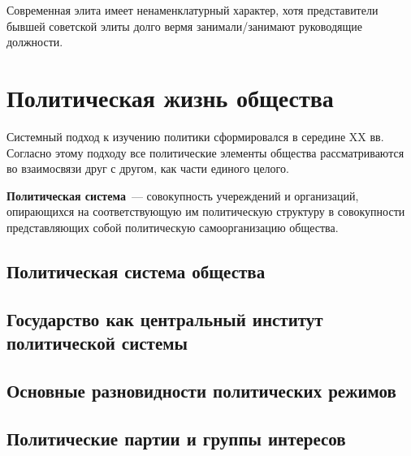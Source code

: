Современная элита имеет ненаменклатурный характер, хотя представители бывшей советской элиты долго вермя занимали/занимают руководящие должности.

\section{Политическая жизнь общества}
Системный подход к изучению политики сформировался в середине XX вв. Согласно этому подходу все политические элементы общества рассматриваются во взаимосвязи друг с другом, как части единого целого.

\textbf{Политическая система}~--- совокупность учереждений и организаций, опирающихся на соответствующую им политическую структуру в совокупности представляющих собой политическую самоорганизацию общества.
\subsection{Политическая система общества}
\subsection{Государство как центральный институт политической системы}
\subsection{Основные разновидности политических режимов}
\subsection{Политические партии и группы интересов}